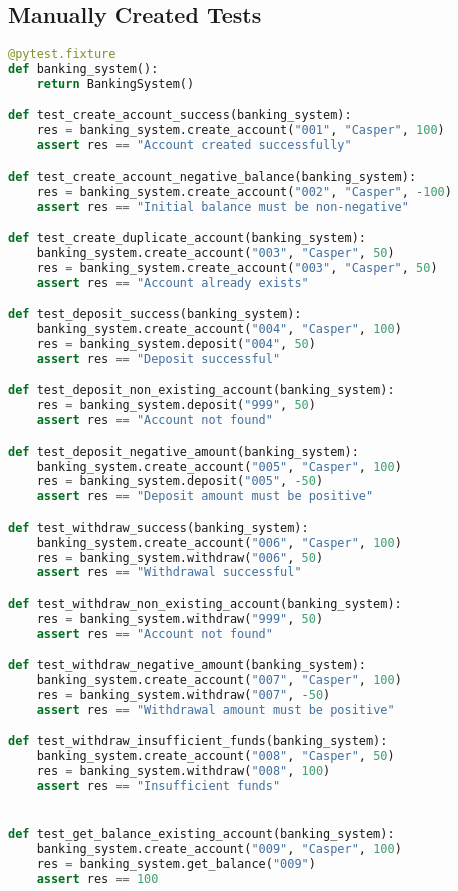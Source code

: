 \documentclass{article}
\begin{document}
\subsection{Manually Created Tests}
\begin{lstlisting}[language=Python]
@pytest.fixture
def banking_system():
    return BankingSystem()

def test_create_account_success(banking_system):
    res = banking_system.create_account("001", "Casper", 100)
    assert res == "Account created successfully"

def test_create_account_negative_balance(banking_system):
    res = banking_system.create_account("002", "Casper", -100)
    assert res == "Initial balance must be non-negative"

def test_create_duplicate_account(banking_system):
    banking_system.create_account("003", "Casper", 50)
    res = banking_system.create_account("003", "Casper", 50)
    assert res == "Account already exists"

def test_deposit_success(banking_system):
    banking_system.create_account("004", "Casper", 100)
    res = banking_system.deposit("004", 50)
    assert res == "Deposit successful"

def test_deposit_non_existing_account(banking_system):
    res = banking_system.deposit("999", 50)
    assert res == "Account not found"

def test_deposit_negative_amount(banking_system):
    banking_system.create_account("005", "Casper", 100)
    res = banking_system.deposit("005", -50)
    assert res == "Deposit amount must be positive"

def test_withdraw_success(banking_system):
    banking_system.create_account("006", "Casper", 100)
    res = banking_system.withdraw("006", 50)
    assert res == "Withdrawal successful"

def test_withdraw_non_existing_account(banking_system):
    res = banking_system.withdraw("999", 50)
    assert res == "Account not found"

def test_withdraw_negative_amount(banking_system):
    banking_system.create_account("007", "Casper", 100)
    res = banking_system.withdraw("007", -50)
    assert res == "Withdrawal amount must be positive"

def test_withdraw_insufficient_funds(banking_system):
    banking_system.create_account("008", "Casper", 50)
    res = banking_system.withdraw("008", 100)
    assert res == "Insufficient funds"


def test_get_balance_existing_account(banking_system):
    banking_system.create_account("009", "Casper", 100)
    res = banking_system.get_balance("009")
    assert res == 100


\end{lstlisting}
\end{document}

